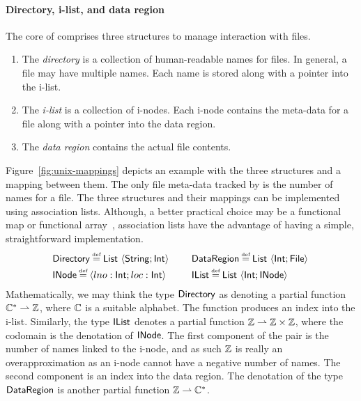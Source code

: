 \documentclass[12pt,phd,lfcs,twoside,openright,logo,leftchapter,normalheadings]{infthesis}
\theoremstyle{plain}
\theoremstyle{definition}
\begin{document}
\paragraph{Directory, i-list, and data region}
%
The core of \fsname{} comprises three structures to manage interaction
with files.
\begin{enumerate}
  \item The \emph{directory} is a collection of human-readable names for
  files. In general, a file may have multiple names. Each name is
  stored along with a pointer into the i-list.
  \item The \emph{i-list} is a collection of i-nodes. Each i-node
  contains the meta-data for a file along with a pointer into the data
  region.
  \item The \emph{data region} contains the actual file contents.
\end{enumerate}
%
%
Figure~\ref{fig:unix-mappings} depicts an example with the three
structures and a mapping between them.
%
The only file meta-data tracked by \fsname{} is the number of names
for a file.
%
The three structures and their mappings can be implemented using
association lists. Although, a better practical choice may be a
functional map or functional array~\cite{Okasaki99}, association lists
have the advantage of having a simple, straightforward implementation.
%
\[
  \ba{@{~}l@{\qquad}c@{~}l}
    \Directory \defas \List~\Record{\String;\Int} &&%
    \DataRegion \defas \List~\Record{\Int;\UFile} \smallskip\\
    \INode \defas \Record{lno:\Int;loc:\Int}  &&%
    \IList \defas \List~\Record{\Int;\INode}
  \ea
\]
%
Mathematically, we may think the type $\mathsf{Directory}$ as denoting a
partial function $\mathbb{C}^\ast \rightharpoonup \mathbb{Z}$, where $\mathbb{C}$ is a suitable
alphabet. The function produces an index into the i-list.
%
Similarly, the type $\mathsf{IList}$ denotes a partial function
$\mathbb{Z} \rightharpoonup \mathbb{Z} \times \mathbb{Z}$, where the codomain is the denotation of
$\mathsf{INode}$. The first component of the pair is the number of names
linked to the i-node, and as such $\mathbb{Z}$ is really an overapproximation
as an i-node cannot have a negative number of names. The second
component is an index into the data region.
%
The denotation of the type $\mathsf{DataRegion}$ is another partial
function $\mathbb{Z} \rightharpoonup \mathbb{C}^\ast$.
\end{document}
